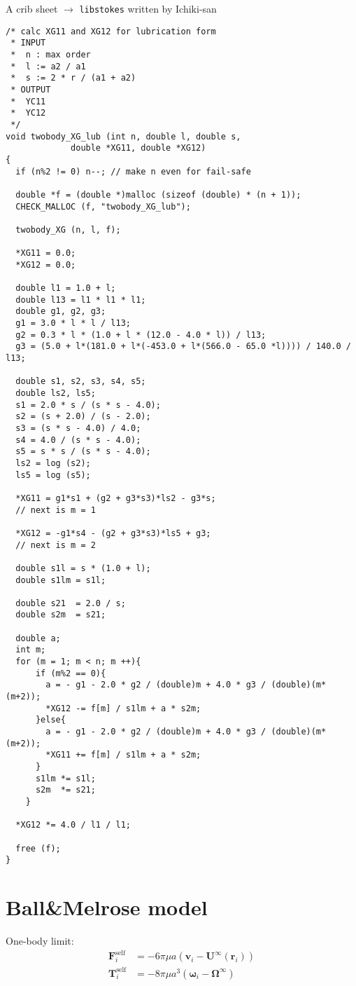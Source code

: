 \documentclass[12pt]{article}
\begin{document}
A crib sheet $\rightarrow$ \texttt{libstokes} written by Ichiki-san
{\footnotesize
\begin{verbatim}
/* calc XG11 and XG12 for lubrication form
 * INPUT
 *  n : max order
 *  l := a2 / a1
 *  s := 2 * r / (a1 + a2)
 * OUTPUT
 *  YC11
 *  YC12
 */
void twobody_XG_lub (int n, double l, double s,
		     double *XG11, double *XG12)
{
  if (n%2 != 0) n--; // make n even for fail-safe

  double *f = (double *)malloc (sizeof (double) * (n + 1));
  CHECK_MALLOC (f, "twobody_XG_lub");

  twobody_XG (n, l, f);

  *XG11 = 0.0;
  *XG12 = 0.0;

  double l1 = 1.0 + l;
  double l13 = l1 * l1 * l1;
  double g1, g2, g3;
  g1 = 3.0 * l * l / l13;
  g2 = 0.3 * l * (1.0 + l * (12.0 - 4.0 * l)) / l13;
  g3 = (5.0 + l*(181.0 + l*(-453.0 + l*(566.0 - 65.0 *l)))) / 140.0 / l13;

  double s1, s2, s3, s4, s5;
  double ls2, ls5;
  s1 = 2.0 * s / (s * s - 4.0);
  s2 = (s + 2.0) / (s - 2.0);
  s3 = (s * s - 4.0) / 4.0;
  s4 = 4.0 / (s * s - 4.0);
  s5 = s * s / (s * s - 4.0);
  ls2 = log (s2);
  ls5 = log (s5);
  
  *XG11 = g1*s1 + (g2 + g3*s3)*ls2 - g3*s;
  // next is m = 1

  *XG12 = -g1*s4 - (g2 + g3*s3)*ls5 + g3;
  // next is m = 2

  double s1l = s * (1.0 + l);
  double s1lm = s1l;

  double s21  = 2.0 / s;
  double s2m  = s21;

  double a;
  int m;
  for (m = 1; m < n; m ++){
      if (m%2 == 0){
        a = - g1 - 2.0 * g2 / (double)m + 4.0 * g3 / (double)(m*(m+2));
        *XG12 -= f[m] / s1lm + a * s2m;
      }else{
        a = - g1 - 2.0 * g2 / (double)m + 4.0 * g3 / (double)(m*(m+2));
        *XG11 += f[m] / s1lm + a * s2m;
      }
      s1lm *= s1l;
      s2m  *= s21;
    }

  *XG12 *= 4.0 / l1 / l1;

  free (f);
}
\end{verbatim}
}

\newpage

\section{Ball\&Melrose model}

One-body limit:
\begin{align}
 \bm{F}_i^{\mathrm{self}} &= 
-6 \pi \mu a ( \bm{v}_i - \bm{U}^{\infty} (\bm{r}_i) ) \\
 \bm{T}_i^{\mathrm{self}} &= 
-8 \pi \mu a^3 ( \bm{\omega}_i - \bm{\Omega}^{\infty})
\end{align}
\end{document}
